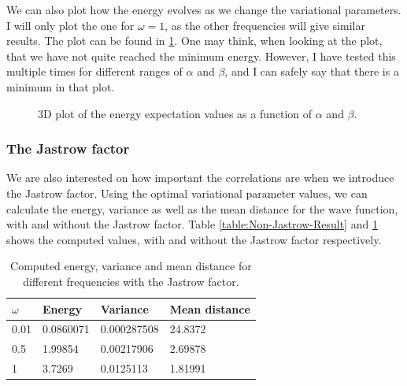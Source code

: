 \documentclass[12pt]{article}
\begin{document}
We can also plot how the energy evolves as we change the variational parameters. I will only plot the one for $\omega = 1$, as the other frequencies will give similar results. The plot can be found in \ref{fig:3DPlot_AlphaBeta_Optimal}.  One may think, when looking at the plot, that we have not quite reached the minimum energy. However, I have tested this multiple times for different ranges of $\alpha$ and $\beta$, and I can safely say that there is a minimum in that plot.
\begin{figure}[h]
\centering
\caption{3D plot of the energy expectation values as a function of $\alpha$ and $\beta$.}
\label{fig:3DPlot_AlphaBeta_Optimal}
\end{figure}



\FloatBarrier
\subsubsection{The Jastrow factor}
We are also interested on how important the correlations are when we introduce the Jastrow factor. Using the optimal variational parameter values, we can calculate the energy, variance as well as the mean distance for the wave function, with and without the Jastrow factor. Table \ref{table:Non-Jastrow-Result} and \ref{table:Jastrow-Result} shows the computed values, with and without the Jastrow factor respectively.

\begin{table}
\begin{center}
	\begin{tabular}{| l | l | l | l |}
	\hline
	 $\omega$ & Energy & Variance & Mean distance \\ \hline
	 0.01 & 0.0860071 & 0.000287508 & 24.8372 \\
	 0.5 & 1.99854 & 0.00217906 & 2.69878 \\
	 1 & 3.7269 & 0.0125113 & 1.81991 \\ \hline
	\end{tabular}
\caption{Computed energy, variance and mean distance for different frequencies with the Jastrow factor.}
\end{center}
\label{table:Jastrow-Result}
\end{table}
\end{document}
